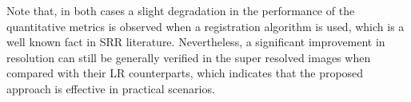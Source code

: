 \documentclass[10pt]{IEEEtran}
\newcommand{\cred}{}
\newcommand{\vy}{\mathbf{y}}
\begin{document}
Note that, in both cases a slight degradation in the performance of the quantitative metrics is observed when a registration algorithm is used, which is a well known fact in SRR literature. Nevertheless, a significant improvement in resolution can still be generally verified in the super resolved images when compared with their LR counterparts, which indicates that the proposed approach is effective in practical scenarios.








%
%

%
%
\end{document}
